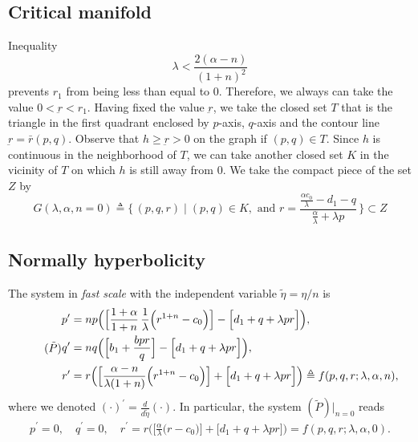 \documentclass[a4paper,11pt]{article}
\begin{document}
\subsection*{Critical manifold}
Inequality
$$ \lambda < \frac{2(\alpha-n)}{(1+n)^2} $$
prevents $r_1$ from being less than equal to $0$. Therefore, we always can take the value $0<\underbar{r}<r_1$. Having fixed the value $\underbar{r}$, we take the closed set $T$ that is the triangle in the first quadrant enclosed by $p$-axis, $q$-axis and the contour line $\underbar{r} = \bar{r}(p,q)$. Observe that $h\ge\underbar{r}>0$ on the graph if $(p,q) \in T$. Since $h$ is continuous in the neighborhood of $T$, we can take another closed set $K$ in the vicinity of $T$ on which $h$ is still away from $0$. We take the compact piece of the set $Z$ by
\begin{equation}
 G(\lambda,\alpha,n=0) \triangleq \Big\{\, (p,q,r) \;|\; (p,q) \in K, \text{ and } r=\frac{ \frac{\alpha c_0}{\lambda} - d_1 -q }{ \frac{\alpha}{\lambda} + \lambda p} \,\Big\} \subset Z
\end{equation}

\subsection*{Normally hyperbolicity}
The system in {\it fast scale} with the independent variable $\tilde{\eta} = \eta/n$ is
\begin{equation}\label{eq:pqr_fast} \tag*{($\tilde{P}$)}
\begin{aligned}
 p^\prime &=np\Big( \Big[\frac{1+\alpha}{1+n}\,\frac{1}{\lambda }\Big(r^{1+n}-c_0\Big)\Big] -\Big[d_1 + q + \lambda pr\Big]\Big), \\
 q^\prime &=nq\Big(\Big[b_1 +\frac{bpr}{q}\Big] -\Big[d_1 + q + \lambda pr\Big]\Big), \\
 r^\prime &=r\Big( \Big[\frac{\alpha-n}{\lambda(1+n)}\Big(r^{1+n}-c_0\Big)\Big]+\Big[d_1 + q + \lambda pr\Big]\Big)\triangleq f(p,q,r;\lambda,\alpha,n),
\end{aligned}
\end{equation}
where we denoted $\displaystyle(\cdot)^\prime = \frac{d}{d\tilde{\eta}}(\cdot)$. In particular, the system $(\tilde{P})|_{n=0}$ reads
\begin{align}
 p^\prime =0, \quad q^\prime =0, \quad r^\prime=r\Big( \Big[\frac{\alpha}{\lambda}\Big(r-c_0\Big)\Big]+\Big[d_1 + q + \lambda pr\Big]\Big) = f(p,q,r;\lambda,\alpha,0). \label{eq:fastn0}
\end{align}
\end{document}
